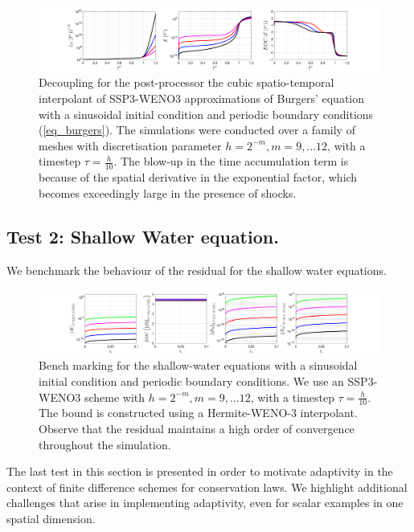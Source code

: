 \documentclass[final]{amsart}
\numberwithin{equation}{section}
\begin{document}
\begin{figure}[H]	
		\includegraphics[width=\textwidth]{../figures/fig_SSP3WENO3_postshockplots_1x5_sin_IC_burgers_decoupled}	
	\caption{\label{fig:SSP3WENO_burgers_decoupled}  Decoupling for the post-processor the cubic spatio-temporal  interpolant of SSP3-WENO3
		approximations of Burgers' equation with a sinusoidal initial condition and periodic boundary conditions
		(\ref{eq_burgers}).  The simulations were conducted over a family of
		meshes with discretisation parameter $h = 2^{-m}, m = 9,\dots 12$,
		with a timestep $\tau = \tfrac{h}{10}$. The blow-up in the time accumulation term is because of the spatial derivative in the exponential factor, which becomes exceedingly large in the presence of shocks. }
\end{figure}

\subsection{Test 2:  Shallow Water equation.  }  We benchmark the behaviour of the residual for the shallow water equations.
\begin{figure}[H]	
	\includegraphics[width=\textwidth]{../figures/fig_SHW_RK3_WENO3_rec3_fixed_gsplots_1x5_sin_IC_P3_shw}	
	\caption{\label{fig:SSP3WENO_SHW} Bench marking for the shallow-water equations with a sinusoidal initial condition and periodic boundary conditions. We use an SSP3-WENO3 scheme with $h = 2^{-m}, m = 9,\dots 12$,
		with a timestep $\tau = \tfrac{h}{10}$.  The bound is constructed using a Hermite-WENO-3 interpolant.  Observe that the residual maintains a high order of convergence throughout the simulation.}
\end{figure}

The last test in this section is presented in order to motivate adaptivity in the context of finite difference schemes for conservation laws. We highlight additional challenges that arise in implementing adaptivity, even for scalar examples in one spatial dimension.  
\end{document}
